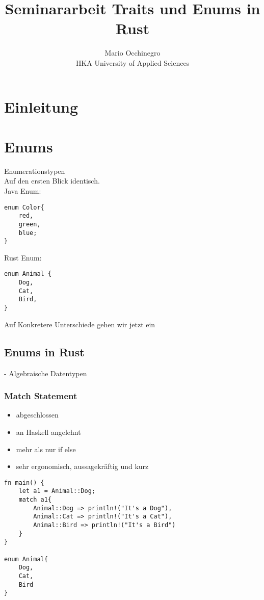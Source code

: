 \documentclass[a4paper, 1ppt]{article}
\title{Seminararbeit Traits und Enums in Rust}
\date{}
\author{Mario Occhinegro\\HKA University of Applied Sciences}
\begin{document}
\maketitle
\newpage
\clearpage
\tableofcontents
\setcounter{page}{1}
\newpage
{}
\maketitle
\begin{abstract}
\end{abstract}
\section{Einleitung}
\section{Enums}
Enumerationstypen \\
Auf den ersten Blick identisch. \\
Java Enum:
\begin{verbatim}
enum Color{
    red,
    green,
    blue;
}
\end{verbatim}
Rust Enum:
\begin{verbatim}
enum Animal {
    Dog,
    Cat,
    Bird,
}
\end{verbatim}
Auf Konkretere Unterschiede gehen wir jetzt ein
\subsection{Enums in Rust}
- Algebraische Datentypen
\subsubsection{Match Statement}
\begin{itemize}
	\item abgeschlossen
	\item an Haskell angelehnt
	\item mehr als nur if else
	\item sehr ergonomisch, aussagekräftig und kurz
\end{itemize}
\begin{verbatim}
fn main() {
	let a1 = Animal::Dog;
	match a1{
		Animal::Dog => println!("It's a Dog"),
		Animal::Cat => println!("It's a Cat"),
		Animal::Bird => println!("It's a Bird")
	}
}

enum Animal{
	Dog,
	Cat,
	Bird
}
\end{verbatim}
\end{document}
